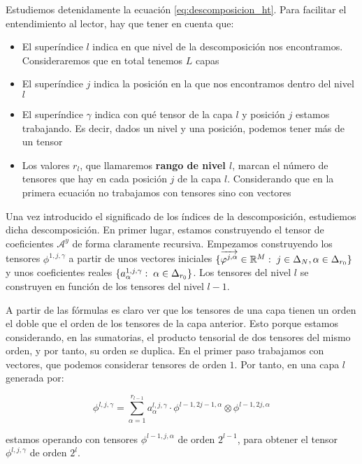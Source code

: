 Estudiemos detenidamente la ecuación \eqref{eq:descomposicion_ht}. Para facilitar el entendimiento al lector, hay que tener en cuenta que:

\begin{itemize}
	\item El superíndice $l$ indica en que nivel de la descomposición nos encontramos. Consideraremos que en total tenemos $L$ capas
	\item El superíndice $j$ indica la posición en la que nos encontramos dentro del nivel $l$
	\item El superíndice $\gamma$ indica con qué tensor de la capa $l$ y posición $j$ estamos trabajando. Es decir, dados un nivel y una posición, podemos tener más de un tensor
	\item Los valores $r_l$, que llamaremos \textbf{rango de nivel $l$}, marcan el número de tensores que hay en cada posición $j$ de la capa $l$. Considerando que en la primera ecuación no trabajamos con tensores sino con vectores
\end{itemize}

Una vez introducido el significado de los índices de la descomposición, estudiemos dicha descomposición. En primer lugar, estamos construyendo el tensor de coeficientes $\mathcal{A}^y$ de forma claramente recursiva. Empezamos construyendo los tensores $\phi^{1, j, \gamma}$ a partir de unos vectores iniciales $\{\overrightarrow{\varphi^{j, \alpha}} \in \mathbb{R}^M: \; j \in \Delta_{N}, \alpha \in \Delta_{r_0}  \}$  y unos coeficientes reales $\{a_{\alpha}^{1, j, \gamma}: \; \alpha \in \Delta_{r_0}\}$. Los tensores del nivel $l$ se construyen en función de los tensores del nivel $l-1$.

A partir de las fórmulas es claro ver que los tensores de una capa tienen un orden el doble que el orden de los tensores de la capa anterior. Esto porque estamos considerando, en las sumatorias, el producto tensorial de dos tensores del mismo orden, y por tanto, su orden se duplica. En el primer paso trabajamos con vectores, que podemos considerar tensores de orden $1$. Por tanto, en una capa $l$ generada por:

\begin{equation}
	\phi^{l, j, \gamma} = \sum_{\alpha = 1}^{r_{l-1}} a_{\alpha}^{l, j, \gamma} \cdot \phi^{l-1, 2j-1, \alpha} \otimes \phi^{l-1, 2j, \alpha}
\end{equation}

estamos operando con tensores $\phi^{l-1, j, \alpha}$ de orden $2^{l-1}$, para obtener el tensor $\phi^{l, j, \gamma}$ de orden $2^l$.

